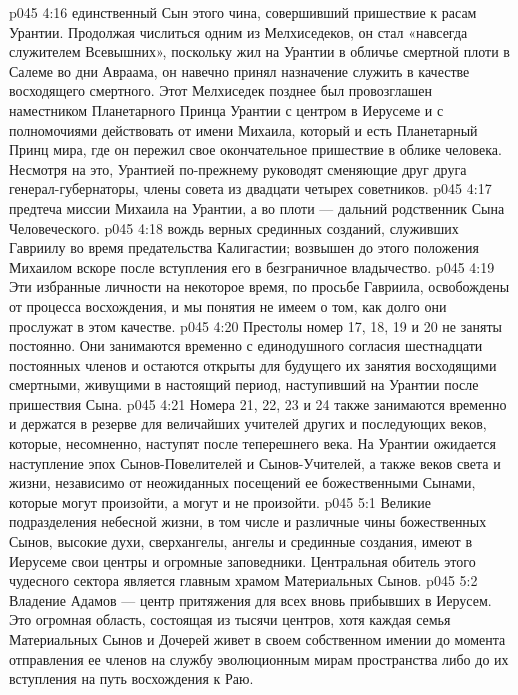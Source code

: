 \vs p045 4:16 \bibnobreakspace {} единственный Сын этого чина, совершивший пришествие к расам Урантии. Продолжая числиться одним из Мелхиседеков, он стал «навсегда служителем Всевышних», поскольку жил на Урантии в обличье смертной плоти в Салеме во дни Авраама, он навечно принял назначение служить в качестве восходящего смертного. Этот Мелхиседек позднее был провозглашен наместником Планетарного Принца Урантии с центром в Иерусеме и с полномочиями действовать от имени Михаила, который и есть Планетарный Принц мира, где он пережил свое окончательное пришествие в облике человека. Несмотря на это, Урантией по\hyp{}прежнему руководят сменяющие друг друга генерал\hyp{}губернаторы, члены совета из двадцати четырех советников.
\vs p045 4:17 \bibnobreakspace {} предтеча миссии Михаила на Урантии, а во плоти --- дальний родственник Сына Человеческого.
\vs p045 4:18 \bibnobreakspace {} вождь верных срединных созданий, служивших Гавриилу во время предательства Калигастии; возвышен до этого положения Михаилом вскоре после вступления его в безграничное владычество.
\vs p045 4:19 \pc Эти избранные личности на некоторое время, по просьбе Гавриила, освобождены от процесса восхождения, и мы понятия не имеем о том, как долго они прослужат в этом качестве.
\vs p045 4:20 Престолы номер 17, 18, 19 и 20 не заняты постоянно. Они занимаются временно с единодушного согласия шестнадцати постоянных членов и остаются открыты для будущего их занятия восходящими смертными, живущими в настоящий период, наступивший на Урантии после пришествия Сына.
\vs p045 4:21 Номера 21, 22, 23 и 24 также занимаются временно и держатся в резерве для величайших учителей других и последующих веков, которые, несомненно, наступят после теперешнего века. На Урантии ожидается наступление эпох Сынов\hyp{}Повелителей и Сынов\hyp{}Учителей, а также веков света и жизни, независимо от неожиданных посещений ее божественными Сынами, которые могут произойти, а могут и не произойти.
\vs p045 5:1 Великие подразделения небесной жизни, в том числе и различные чины божественных Сынов, высокие духи, сверхангелы, ангелы и срединные создания, имеют в Иерусеме свои центры и огромные заповедники. Центральная обитель этого чудесного сектора является главным храмом Материальных Сынов.
\vs p045 5:2 Владение Адамов --- центр притяжения для всех вновь прибывших в Иерусем. Это огромная область, состоящая из тысячи центров, хотя каждая семья Материальных Сынов и Дочерей живет в своем собственном имении до момента отправления ее членов на службу эволюционным мирам пространства либо до их вступления на путь восхождения к Раю.
